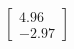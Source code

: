 \documentclass[preview]{standalone}
\begin{document}
\begin{align*}
\begin{bmatrix} 4.96 \\ -2.97 \end{bmatrix}
\end{align*}
\end{document}
